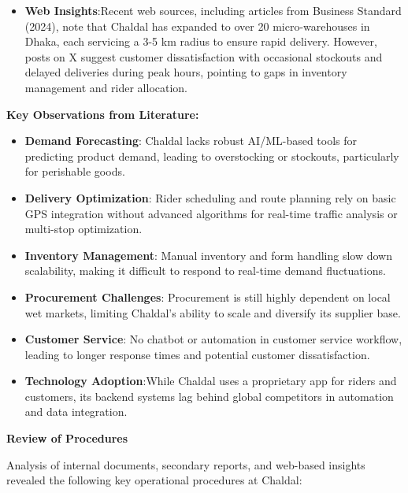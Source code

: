 \documentclass[12pt,a4paper]{article}
\begin{document}
\begin{itemize}
    \item \textbf{Web Insights}:Recent web sources, including articles from Business Standard (2024), note that Chaldal has expanded to over 20 micro-warehouses in Dhaka, each servicing a 3-5 km radius to ensure rapid delivery. However, posts on X suggest customer dissatisfaction with occasional stockouts and delayed deliveries during peak hours, pointing to gaps in inventory management and rider allocation.
\end{itemize}

\vspace{1em}
\textbf{Key Observations from Literature:}
\begin{itemize}
    \item \textbf{Demand Forecasting}: Chaldal lacks robust AI/ML-based tools for predicting product demand, leading to overstocking or stockouts, particularly for perishable goods.
    \item \textbf{Delivery Optimization}: Rider scheduling and route planning rely on basic GPS integration without advanced algorithms for real-time traffic analysis or multi-stop optimization.
    \item \textbf{Inventory Management}: Manual inventory and form handling slow down scalability, making it difficult to respond to real-time demand fluctuations.
    \item \textbf{Procurement Challenges}: Procurement is still highly dependent on local wet markets, limiting Chaldal’s ability to scale and diversify its supplier base.
    \item \textbf{Customer Service}: No chatbot or automation in customer service workflow, leading to longer response times and potential customer dissatisfaction.
    \item \textbf{Technology Adoption}:While Chaldal uses a proprietary app for riders and customers, its backend systems lag behind global competitors in automation and data integration.
\end{itemize}

\vspace{.4em}
{\large\bfseries Review of Procedures}

Analysis of internal documents, secondary reports, and web-based insights revealed the following key operational procedures at Chaldal:
\end{document}

